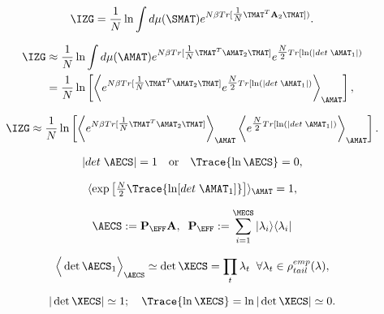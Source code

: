 \begin{align}
  \label{eqn:IZG_dmuS}
  \IZG = \frac{1}{N}\ln \int d\mu(\SMAT)  e^{ N\beta Tr[ \tfrac{1}{N}\TMAT^T\mathbf{A}_{2}\TMAT]) }  .
\end{align}

\begin{align}
  \nonumber %
  \IZG 
  &\approx \frac{1}{N}\ln
    \int d\mu(\AMAT)
  e^{N\beta Tr[ \tfrac{1}{N}\TMAT^T\AMAT_{2}\TMAT] }
  e^{\tfrac{N}{2}Tr[\ln(|det\;\AMAT_{1}|)} \\
  \label{eqn:IFA2_braket}
  & = \frac{1}{N}\ln\left[
  \left\langle
  e^{N\beta Tr[ \tfrac{1}{N}\TMAT^T\AMAT_{2}\TMAT] }
  e^{\tfrac{N}{2}Tr[\ln(|det\;\AMAT_{1}|)}
    \right\rangle_{\AMAT}
    \right] ,
\end{align}

\begin{align}
  \label{eqn:IFA2}
  \IZG \approx \frac{1}{N}\ln\left[
  \left\langle
  e^{N\beta Tr[ \tfrac{1}{N}\TMAT^T\AMAT_{2}\TMAT] }
  \right\rangle_{\AMAT}
  \left\langle
  e^{\tfrac{N}{2}Tr[\ln(|det\;\AMAT_{1}|)}
    \right\rangle_{\AMAT}
    \right]  .
\end{align}

\begin{align}
\label{eqn:tlc_mm}
|det\;\AECS|=1 
\quad\mbox{or}\quad
\Trace{\ln \AECS}=0  ,
\end{align}

\begin{align}
  \langle \exp\left[\tfrac{N}{2} \Trace{ \ln[det\;\AMAT_{1}] } \right]\rangle_{\AMAT}=1 ,
 \end{align}

\begin{align}
  \label{sqn:AecsDefined}
  \AECS:=\mathbf{P}_{\EFF}\mathbf{A},\;\;  \mathbf{P}_{\EFF}:= \sum_{i=1}^{\MECS}|\lambda_{i}\rangle\langle\lambda_{i}|
\end{align}

\begin{align}
\label{eqn:IFA-ppint}
\Big\langle \det\AECS_{1}\Big\rangle_{\AECS}\simeq\det\XECS=\prod_{t}\lambda_{t}\;\;\forall\lambda_{t}\in\rho^{emp}_{tail}(\lambda) ,
\end{align}

\begin{equation}
\label{eqn:detX}
\vert\det\XECS\vert \simeq 1 ; \quad \Trace{ \ln\XECS } = \ln\vert\det\XECS\vert \simeq 0  .
\end{equation}


